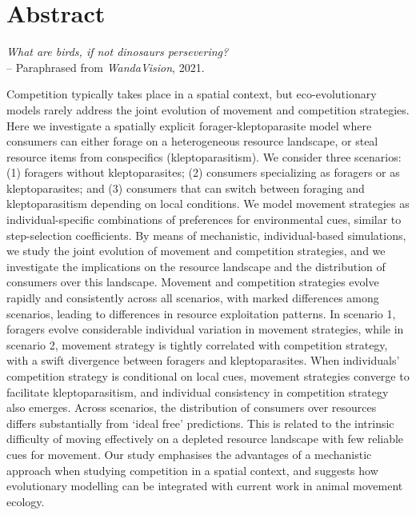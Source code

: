 \begingroup
\let\clearpage\relax
\let\cleardoublepage\relax
\let\cleardoublepage\relax

\chapter*{Abstract}

\begin{center}
    \emph{What are birds, if not dinosaurs persevering?}\\
    \medskip
    -- \small{Paraphrased from \textit{WandaVision}, 2021.}
\end{center}

Competition typically takes place in a spatial context, but eco-evolutionary models rarely address the joint evolution of movement and competition strategies. 
Here we investigate a spatially explicit forager-kleptoparasite model where consumers can either forage on a heterogeneous resource landscape, or steal resource items from conspecifics (kleptoparasitism). 
We consider three scenarios: (1) foragers without kleptoparasites; (2) consumers specializing as foragers or as kleptoparasites; and (3) consumers that can switch between foraging and kleptoparasitism depending on local conditions.
We model movement strategies as individual-specific combinations of preferences for environmental cues, similar to step-selection coefficients.
By means of mechanistic, individual-based simulations, we study the joint evolution of movement and competition strategies, and we investigate the implications on the resource landscape and the distribution of consumers over this landscape.
Movement and competition strategies evolve rapidly and consistently across all scenarios, with marked differences among scenarios, leading to differences in resource exploitation patterns.
In scenario 1, foragers evolve considerable individual variation in movement strategies, while in scenario 2, movement strategy is tightly correlated with competition strategy, with a swift divergence between foragers and kleptoparasites.
When individuals' competition strategy is conditional on local cues, movement strategies converge to facilitate kleptoparasitism, and individual consistency in competition strategy also emerges.
Across scenarios, the distribution of consumers over resources differs substantially from `ideal free' predictions. 
This is related to the intrinsic difficulty of moving effectively on a depleted resource landscape with few reliable cues for movement.
Our study emphasises the advantages of a mechanistic approach when studying competition in a spatial context, and suggests how evolutionary modelling can be integrated with current work in animal movement ecology.

